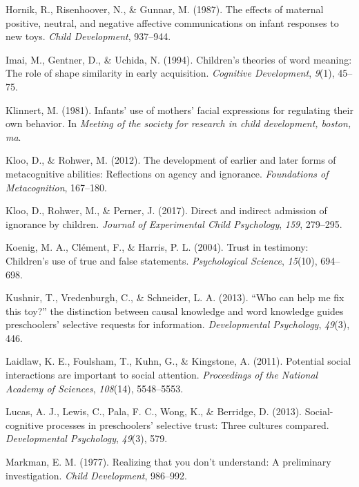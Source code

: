 \documentclass[floatsintext,man]{apa6}
\theoremstyle{definition}
\theoremstyle{definition}
\theoremstyle{definition}
\theoremstyle{remark}
\begin{document}
\hypertarget{ref-hornik1987effects}{}
Hornik, R., Risenhoover, N., \& Gunnar, M. (1987). The effects of
maternal positive, neutral, and negative affective communications on
infant responses to new toys. \emph{Child Development}, 937--944.

\hypertarget{ref-imai1994children}{}
Imai, M., Gentner, D., \& Uchida, N. (1994). Children's theories of word
meaning: The role of shape similarity in early acquisition.
\emph{Cognitive Development}, \emph{9}(1), 45--75.

\hypertarget{ref-klinnert1981infants}{}
Klinnert, M. (1981). Infants' use of mothers' facial expressions for
regulating their own behavior. In \emph{Meeting of the society for
research in child development, boston, ma}.

\hypertarget{ref-kloo2012development}{}
Kloo, D., \& Rohwer, M. (2012). The development of earlier and later
forms of metacognitive abilities: Reflections on agency and ignorance.
\emph{Foundations of Metacognition}, 167--180.

\hypertarget{ref-kloo2017direct}{}
Kloo, D., Rohwer, M., \& Perner, J. (2017). Direct and indirect
admission of ignorance by children. \emph{Journal of Experimental Child
Psychology}, \emph{159}, 279--295.

\hypertarget{ref-koenig2004trust}{}
Koenig, M. A., Clément, F., \& Harris, P. L. (2004). Trust in testimony:
Children's use of true and false statements. \emph{Psychological
Science}, \emph{15}(10), 694--698.

\hypertarget{ref-kushnir2013can}{}
Kushnir, T., Vredenburgh, C., \& Schneider, L. A. (2013). ``Who can help
me fix this toy?'' the distinction between causal knowledge and word
knowledge guides preschoolers' selective requests for information.
\emph{Developmental Psychology}, \emph{49}(3), 446.

\hypertarget{ref-laidlaw2011potential}{}
Laidlaw, K. E., Foulsham, T., Kuhn, G., \& Kingstone, A. (2011).
Potential social interactions are important to social attention.
\emph{Proceedings of the National Academy of Sciences}, \emph{108}(14),
5548--5553.

\hypertarget{ref-lucas2013social}{}
Lucas, A. J., Lewis, C., Pala, F. C., Wong, K., \& Berridge, D. (2013).
Social-cognitive processes in preschoolers' selective trust: Three
cultures compared. \emph{Developmental Psychology}, \emph{49}(3), 579.

\hypertarget{ref-markman1977realizing}{}
Markman, E. M. (1977). Realizing that you don't understand: A
preliminary investigation. \emph{Child Development}, 986--992.
\end{document}
